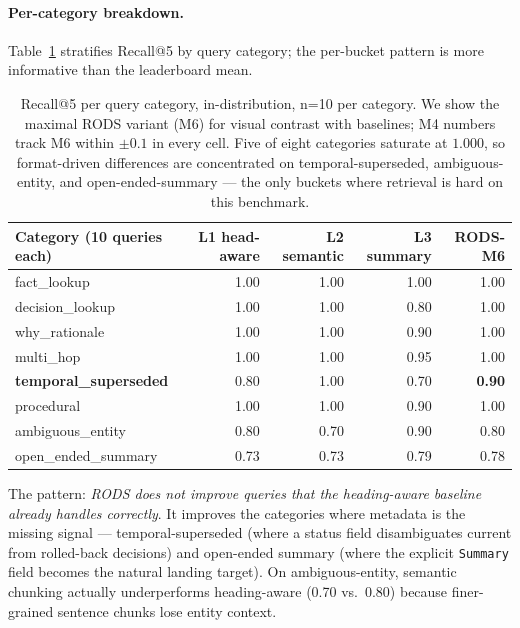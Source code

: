 \documentclass[11pt]{article}
\begin{document}
\paragraph{Per-category breakdown.}
Table~\ref{tab:per_category} stratifies Recall@5 by query category;
the per-bucket pattern is more informative than the leaderboard mean.

\begin{table}[t]
\centering
\caption{Recall@5 per query category, in-distribution, n=10 per
  category. We show the maximal RODS variant (M6) for visual contrast
  with baselines; M4 numbers track M6 within $\pm 0.1$ in every cell.
  Five of eight categories saturate at $1.000$, so format-driven
  differences are concentrated on temporal-superseded, ambiguous-entity,
  and open-ended-summary --- the only buckets where retrieval is hard
  on this benchmark.}
\label{tab:per_category}
\small
\begin{tabular}{lrrrr}
\toprule
\textbf{Category (10 queries each)} & \textbf{L1 head-aware} & \textbf{L2 semantic} & \textbf{L3 summary} & \textbf{RODS-M6} \\
\midrule
fact\_lookup            & 1.00 & 1.00 & 1.00 & 1.00 \\
decision\_lookup        & 1.00 & 1.00 & 0.80 & 1.00 \\
why\_rationale          & 1.00 & 1.00 & 0.90 & 1.00 \\
multi\_hop              & 1.00 & 1.00 & 0.95 & 1.00 \\
\rowcolor{bestcolor!12}
\textbf{temporal\_superseded} & 0.80 & 1.00 & 0.70 & \textbf{0.90} \\
procedural              & 1.00 & 1.00 & 0.90 & 1.00 \\
ambiguous\_entity       & 0.80 & 0.70 & 0.90 & 0.80 \\
open\_ended\_summary    & 0.73 & 0.73 & 0.79 & 0.78 \\
\bottomrule
\end{tabular}
\end{table}

The pattern: \emph{RODS does not improve queries that the heading-aware
baseline already handles correctly}. It improves the categories where
metadata is the missing signal --- temporal-superseded (where a status
field disambiguates current from rolled-back decisions) and open-ended
summary (where the explicit \texttt{Summary} field becomes the natural
landing target). On ambiguous-entity, semantic chunking actually
underperforms heading-aware (0.70 vs.\ 0.80) because finer-grained
sentence chunks lose entity context.
\end{document}

